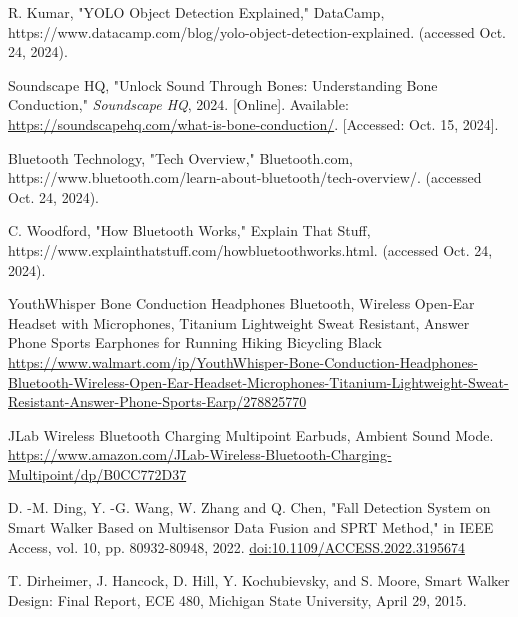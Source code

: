 \begin{thebibliography}{45}
	 R. Kumar, "YOLO Object Detection Explained," DataCamp, https://www.datacamp.com/blog/yolo-object-detection-explained. (accessed Oct. 24, 2024).
	
	 Soundscape HQ, "Unlock Sound Through Bones: Understanding Bone Conduction," \emph{Soundscape HQ}, 2024. [Online]. Available: \href{https://soundscapehq.com/what-is-bone-conduction/}{https://soundscapehq.com/what-is-bone-conduction/}. [Accessed: Oct. 15, 2024].

	 Bluetooth Technology, "Tech Overview," Bluetooth.com, https://www.bluetooth.com/learn-about-bluetooth/tech-overview/. (accessed Oct. 24, 2024).
	
	 C. Woodford, "How Bluetooth Works," Explain That Stuff, https://www.explainthatstuff.com/howbluetoothworks.html. (accessed Oct. 24, 2024).

	 YouthWhisper Bone Conduction Headphones Bluetooth, Wireless Open-Ear Headset with Microphones, Titanium Lightweight Sweat Resistant, Answer Phone Sports Earphones for Running Hiking Bicycling Black \href{https://www.walmart.com/ip/YouthWhisper-Bone-Conduction-Headphones-Bluetooth-Wireless-Open-Ear-Headset-Microphones-Titanium-Lightweight-Sweat-Resistant-Answer-Phone-Sports-Earp/278825770?clickid=WjORv5UqyxyKRJqTvVUblVgLUkCRR\%3AxQe1ri}{https://www.walmart.com/ip/YouthWhisper-Bone-Conduction-Headphones-Bluetooth-Wireless-Open-Ear-Headset-Microphones-Titanium-Lightweight-Sweat-Resistant-Answer-Phone-Sports-Earp/278825770}
	
	 JLab Wireless Bluetooth Charging Multipoint Earbuds, Ambient Sound Mode. \href{https://www.amazon.com/JLab-Wireless-Bluetooth-Charging-Multipoint/dp/B0CC772D37}{https://www.amazon.com/JLab-Wireless-Bluetooth-Charging-Multipoint/dp/B0CC772D37}
	
	 D. -M. Ding, Y. -G. Wang, W. Zhang and Q. Chen, "Fall Detection System on Smart Walker Based on Multisensor Data Fusion and SPRT Method," in IEEE Access, vol. 10, pp. 80932-80948, 2022. \href{https://doi.org/10.1109/ACCESS.2022.3195674}{doi:10.1109/ACCESS.2022.3195674}
	
	 T. Dirheimer, J. Hancock, D. Hill, Y. Kochubievsky, and S. Moore, Smart Walker Design: Final Report, ECE 480, Michigan State University, April 29, 2015.
	

\end{thebibliography}
